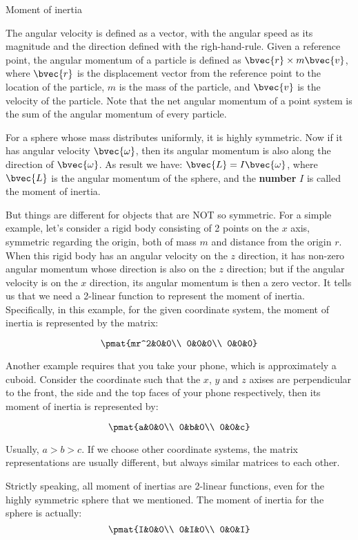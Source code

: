 \begin{example}{Moment of inertia}


The angular velocity is defined as a vector, with the angular speed as its magnitude and the direction defined with the righ-hand-rule. Given a reference point, the angular momentum of a particle is defined as $\bvec{r}\times m\bvec{v}$, where $\bvec{r}$ is the displacement vector from the reference point to the location of the particle, $m$ is the mass of the particle, and $\bvec{v}$ is the velocity of the particle. Note that the net angular momentum of a point system is the sum of the angular momentum of every particle. 

For a sphere whose mass distributes uniformly, it is highly symmetric. Now if it has angular velocity $\bvec{\omega}$, then its angular momentum is also along the direction of $\bvec{\omega}$. As result we have: $\bvec{L}=I\bvec{\omega}$, where $\bvec{L}$ is the angular momentum of the sphere, and the \textbf{number} $I$ is called the moment of inertia. 

But things are different for objects that are NOT so symmetric. For a simple example, let's consider a rigid body consisting of 2 points on the $x$ axis, symmetric regarding the origin, both of mass $m$ and distance from the origin $r$. When this rigid body has an angular velocity on the $z$ direction, it has non-zero angular momentum whose direction is also on the $z$ direction; but if the angular velocity is on the $x$ direction, its angular momentum is then a zero vector. It tells us that we need a 2-linear function to represent the moment of inertia. Specifically, in this example, for the given coordinate system, the moment of inertia is represented by the matrix: 

\begin{equation}
\pmat{mr^2&0&0\\ 0&0&0\\ 0&0&0}
\end{equation}

Another example requires that you take your phone, which is approximately a cuboid. Consider the coordinate such that the $x$, $y$ and $z$ axises are perpendicular to the front, the side and the top faces of your phone respectively, then its moment of inertia is represented by: 

\begin{equation}
\pmat{a&0&0\\ 0&b&0\\ 0&0&c}
\end{equation}

Usually, $a>b>c$. If we choose other coordinate systems, the matrix representations are usually different, but always similar matrices to each other. 

Strictly speaking, all moment of inertias are 2-linear functions, even for the highly symmetric sphere that we mentioned. The moment of inertia for the sphere is actually: 
\begin{equation}
\pmat{I&0&0\\ 0&I&0\\ 0&0&I}
\end{equation}
\end{example}

